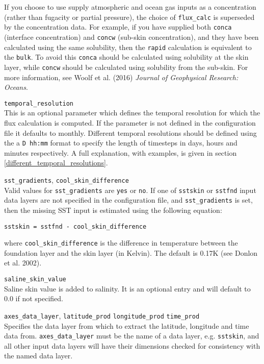 \documentclass[]{scrartcl}
\newcommand{\conflistingsep}{\vspace{0.40cm}}
\begin{document}
If you choose to use supply atmospheric and ocean gas inputs as a concentration (rather than fugacity or partial pressure), the choice of \texttt{flux\_calc} is superseded by the concentration data. For example, if you have supplied both \texttt{conca} (interface concentration) and \texttt{concw} (sub-skin concentration), and they have been calculated using the same solubility, then the \texttt{rapid} calculation is equivalent to the \texttt{bulk}. To avoid this \texttt{conca} should be calculated using solubility at the skin layer, while \texttt{concw} should be calculated using solubility from the sub-skin. For more information, see Woolf et al. (2016) \textit{Journal of Geophysical Research: Oceans}.

\conflistingsep \noindent
\texttt{temporal\_resolution}\\
This is an optional parameter which defines the temporal resolution for which the flux calculation is computed. If the parameter is not defined in the configuration file it defaults to monthly. Different temporal resolutions should be defined using the a \texttt{D hh:mm} format to specify the length of timesteps in days, hours and minutes respectively. A full explanation, with examples, is given in section \ref{different_temporal_resolutions}.

\conflistingsep \noindent
\texttt{sst\_gradients}, \texttt{cool\_skin\_difference}\\
Valid values for \texttt{sst\_gradients} are \texttt{yes} or \texttt{no}. If one of \texttt{sstskin} or \texttt{sstfnd} input data layers are not specified in the configuration file, and \texttt{sst\_gradients} is set, then the missing SST input is estimated using the following equation:
\begin{lstlisting}[frame=none]
sstskin = sstfnd - cool_skin_difference
\end{lstlisting}
where \texttt{cool\_skin\_difference} is the difference in temperature between the foundation layer and the skin layer (in Kelvin). The default is 0.17K (see Donlon et al. 2002).

\conflistingsep \noindent \texttt{saline\_skin\_value}\\
Saline skin value is added to salinity. It is an optional entry and will default to $0.0$ if not specified.

\conflistingsep \noindent \texttt{axes\_data\_layer}, \texttt{latitude\_prod} \texttt{longitude\_prod} \texttt{time\_prod}\\
Specifies the data layer from which to extract the latitude, longitude and time data from. \texttt{axes\_data\_layer} must be the name of a data layer, e.g. \texttt{sstskin}, and all other input data layers will have their dimensions checked for consistency with the named data layer.
\end{document}
